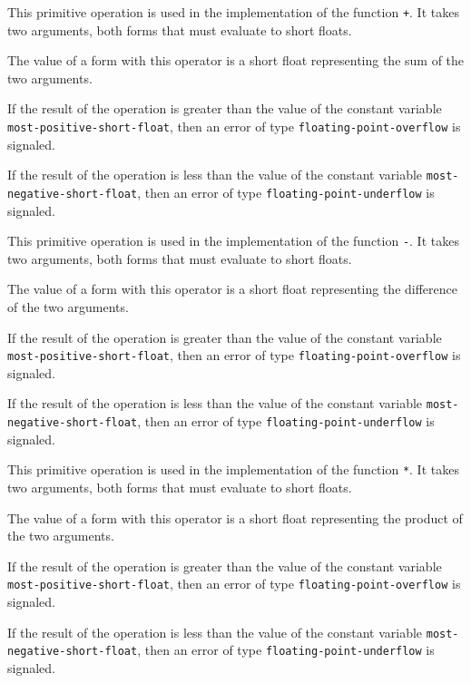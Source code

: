  {}

This primitive operation is used in the implementation of the
\commonlisp{} function \texttt{+}.  It takes two arguments, both forms
that must evaluate to short floats.

The value of a form with this operator is a short float
representing the sum of the two arguments.

If the result of the operation is greater than the value of the
constant variable \texttt{most-positive-short-float}, then an error of
type \texttt{floating-point-overflow} is signaled.

If the result of the operation is less than the value of the
constant variable \texttt{most-negative-short-float}, then an error of
type \texttt{floating-point-underflow} is signaled.

 {}

This primitive operation is used in the implementation of the
\commonlisp{} function \texttt{-}.  It takes two arguments, both forms
that must evaluate to short floats.

The value of a form with this operator is a short float
representing the difference of the two arguments.

If the result of the operation is greater than the value of the
constant variable \texttt{most-positive-short-float}, then an error of
type \texttt{floating-point-overflow} is signaled.

If the result of the operation is less than the value of the
constant variable \texttt{most-negative-short-float}, then an error of
type \texttt{floating-point-underflow} is signaled.

 {}

This primitive operation is used in the implementation of the
\commonlisp{} function \texttt{*}.  It takes two arguments, both forms
that must evaluate to short floats.

The value of a form with this operator is a short float
representing the product of the two arguments.

If the result of the operation is greater than the value of the
constant variable \texttt{most-positive-short-float}, then an error of
type \texttt{floating-point-overflow} is signaled.

If the result of the operation is less than the value of the constant
variable \texttt{most-negative-short-float}, then an error of type
\texttt{floating-point-underflow} is signaled.


